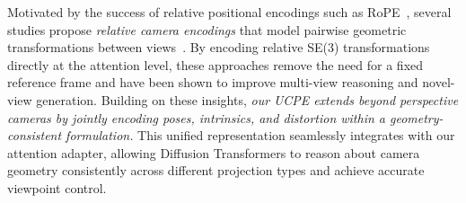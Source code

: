 Motivated by the success of relative positional encodings such as RoPE~\cite{heo2024rotary}, several studies propose \textit{relative camera encodings} that model pairwise geometric transformations between views~\cite{safin2023repast,miyato2023gta,kong2024eschernet,li2025cameras}.
By encoding relative SE(3) transformations directly at the attention level, these approaches remove the need for a fixed reference frame and have been shown to improve multi-view reasoning and novel-view generation.
Building on these insights, \textit{our UCPE %
extends beyond perspective cameras by jointly encoding poses, intrinsics, and distortion within a geometry-consistent formulation.}
This unified representation seamlessly integrates with our attention adapter, allowing Diffusion Transformers to reason about camera geometry consistently across different projection types and achieve accurate viewpoint control.
